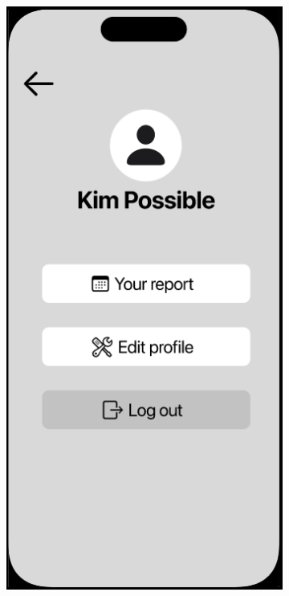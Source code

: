 \documentclass[11pt]{article}
\begin{document}
\begin{figure}[h!]
     \centering
     \begin{subfigure}[b]{0.3\textwidth}
         \centering
         \includegraphics[width=\textwidth]{figures/profile overview.PNG}

\end{subfigure}
\end{figure}
\end{document}
